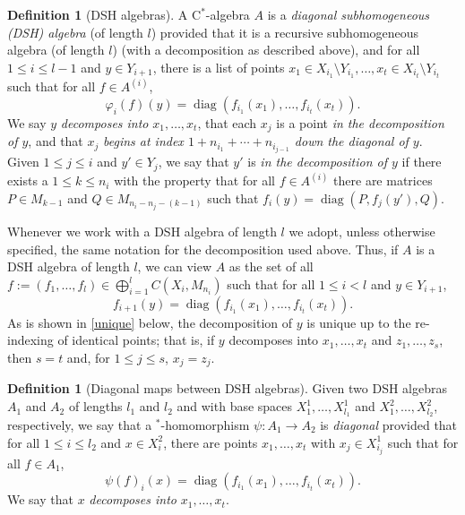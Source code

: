 \documentclass[12pt]{amsart}
\numberwithin{equation}{section}
\theoremstyle{definition}
\newtheorem{definition}[theorem]{Definition}
\theoremstyle{remark}
\newcommand{\diag}{\operatorname{diag}}
\begin{document}
\begin{definition}[DSH algebras]
	\label{DSH def}
	A $\mathrm{C}^*$-algebra $A$ is a \textit{diagonal subhomogeneous (DSH) algebra} (of length $ l$) provided that it is a recursive subhomogeneous algebra (of length $ l$) (with a decomposition as described above), and for all $1\leq i\leq  l-1$ and $y\in Y_{i+1}$, there is a list of points $x_{1}\in X_{i_{1}}\setminus Y_{i_{1}},\ldots, x_{t}\in X_{i_{t}}\setminus Y_{i_{t}}$ such that for all $f\in A^{(i)}$, 
	$$
	\varphi_{i}(f)(y)=\diag(f_{i_{1}}(x_{1}),\ldots,f_{i_{t}}(x_{t})).
	$$
	We say $y$ \textit{decomposes into} $x_{1},\ldots,x_{t}$, that each $x_{j}$ is a point \textit{in the decomposition of $y$}, and that $x_{j}$ \textit{begins at index $1+n_{i_{1}}+\cdots+n_{i_{j-1}}$ down the diagonal of $y$}. 	Given $1\leq j\leq i$ and $y'\in Y_{j}$, we say that $y'$ is \textit{in the decomposition of $y$} if there exists a $1\leq k\leq n_{i}$ with the property that for all $f\in A^{(i)}$ there are matrices $P\in M_{k-1}$ and $Q\in M_{n_{i}-n_{j}-(k-1)}$ such that $f_{i}(y)=\diag(P,f_{j}(y'),Q)$. 
\end{definition}


Whenever we work with a DSH algebra of length $ l$ we adopt, unless otherwise specified, the same notation for the decomposition used above. Thus, if $A$ is a DSH algebra of length $ l$, we can view $A$ as the set of all $f:=(f_{1},\ldots,f_{ l})\in\bigoplus_{i=1}^{ l}C(X_{i},M_{n_{i}})$ such that for all $1\leq i< l$ and $y\in Y_{i+1}$, 
$$
f_{i+1}(y)=\diag\left(f_{i_{1}}(x_{1}),\ldots,f_{i_{t}}(x_{t})\right).
$$
As is shown in \autoref{unique} below, the decomposition of $y$ is unique up to the re-indexing of identical points; that is, if $y$ decomposes into $x_{1},\ldots,x_{t}$ and $z_{1},\ldots,z_{s}$, then $s=t$ and, for $1\leq j\leq s$, $x_{j}=z_{j}$.  

\begin{definition}[Diagonal maps between DSH algebras]
	\label{diagonal map}
	Given two DSH algebras $A_{1}$ and $A_{2}$ of lengths $ l_{1}$ and $ l_{2}$ and with base spaces $X_{1}^{1},\ldots,X_{ l_{1}}^{1}$ and $X_{1}^{2},\ldots,X_{ l_{2}}^{2}$, respectively, we say that a $^*$-homomorphism $\psi\colon A_{1}\to A_{2}$ is \textit{diagonal} provided that for all $1\leq i\leq  l_{2}$ and $x\in X_{i}^{2}$, there are points $x_{1},\ldots,x_{t}$ with $x_{j}\in X_{i_{j}}^{1}$ such that for all $f\in A_{1}$, 
	$$
	\psi(f)_{i}(x)=\diag(f_{i_{1}}(x_{1}),\ldots,f_{i_{t}}(x_{t})).
	$$
	We say that $x$ \textit{decomposes into} $x_{1},\ldots,x_{t}$.
\end{definition}
\end{document}
